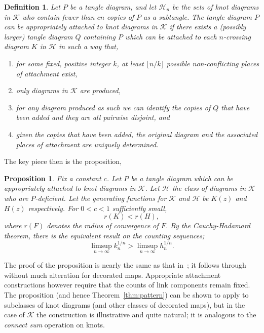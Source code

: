 \documentclass[submission%
]{dmtcs}
\newcommand{\KnotDiaClass}{\mathscr{K}}
\newcommand{\KnotDiaGF}{K}
\newcommand{\KnotDiaCard}{k}
\newtheorem{proposition}{Proposition}
\newtheorem*{definition}{Definition}
\begin{document}
\begin{definition}
  Let $P$ be a tangle diagram, and let $\mathscr{H}_n$ be the sets of
  knot diagrams in $\KnotDiaClass$ who contain fewer than $cn$ copies
  of $P$ as a subtangle. The tangle diagram $P$ can be
  \emph{appropriately attached} to knot diagrams in $\KnotDiaClass$ if
  there exists a (possibly larger) tangle diagram $Q$ containing $P$
  which can be attached to each $n$-crossing diagram $K$ in
  $\mathscr{H}$ in such a way that,
  \begin{enumerate}
  \item for some fixed, positive integer $k$, at least
    $\lfloor n/k \rfloor$ possible non-conflicting places of
    attachment exist,
  \item only diagrams in $\KnotDiaClass$ are produced,
  \item for any diagram produced as such we can identify the copies of
    $Q$ that have been added and they are all pairwise disjoint, and
  \item given the copies that have been added, the original diagram
    and the associated places of attachment are uniquely determined.
  \end{enumerate}
\end{definition}
The key piece then is the proposition,

\begin{proposition}
  Fix a constant $c$. Let $P$ be a tangle diagram which can be
  appropriately attached to knot diagrams in $\KnotDiaClass$. Let
  $\mathscr{H}$ the class of diagrams in $\KnotDiaClass$ who are
  $P$-deficient. Let the generating functions for
  $\KnotDiaClass$ and $\mathscr{H}$ be $\KnotDiaGF(z)$ and $H(z)$
  respectively. For $0 < c < 1$ sufficiently small,
  \begin{displaymath}
    r(\KnotDiaGF) < r(H),
  \end{displaymath}
  where $r(F)$ denotes the radius of convergence of $F$. By the
  Cauchy-Hadamard theorem, there is the equivalent result on the
  counting sequences;
  \begin{displaymath}
    \limsup_{n\to\infty}{\KnotDiaCard_n^{1/n}} > \limsup_{n\to\infty}{h_n^{1/n}}.
  \end{displaymath}
\end{proposition}

The proof of the proposition is nearly the same as that
in~\cite{Bender1992104}; it follows through without much alteration
for decorated maps. Appropriate attachment constructions however
require that the counts of link components remain fixed. The
proposition (and hence Theorem~\ref{thm:pattern}) can be shown to
apply to subclasses of knot diagrams (and other classes of decorated
maps), but in the case of $\KnotDiaClass$ the construction is
illustrative and quite natural; it is analogous to the \emph{connect
  sum} operation on knots.
\end{document}
